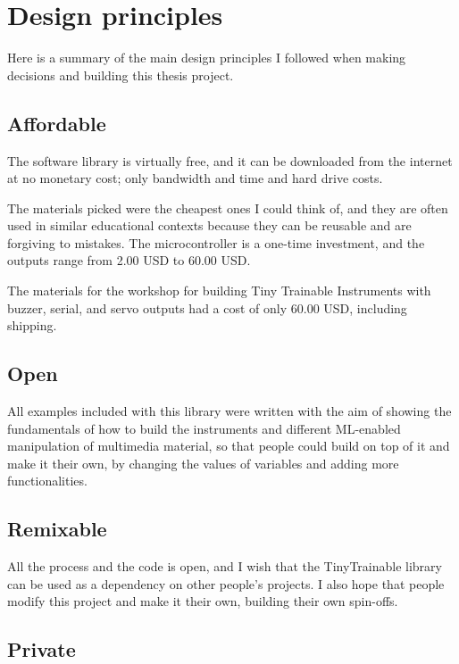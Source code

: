 \section{Design principles}

Here is a summary of the main design principles I followed when making decisions and building this thesis project.

\subsection{Affordable}

The software library is virtually free, and it can be downloaded from the internet at no monetary cost; only bandwidth and time and hard drive costs.

The materials picked were the cheapest ones I could think of, and they are often used in similar educational contexts because they can be reusable and are forgiving to mistakes. The microcontroller is a one-time investment, and the outputs range from 2.00 USD to 60.00 USD. 

The materials for the workshop for building Tiny Trainable Instruments with buzzer, serial, and servo outputs had a cost of only 60.00 USD, including shipping.

\subsection{Open}

All examples included with this library were written with the aim of showing the fundamentals of how to build the instruments and different \acrshort{ML}-enabled manipulation of multimedia material, so that people could build on top of it and make it their own, by changing the values of variables and adding more functionalities.

\subsection{Remixable}

All the process and the code is open, and I wish that the TinyTrainable library can be used as a dependency on other people's projects. I also hope that people modify this project and make it their own, building their own spin-offs. 

\subsection{Private}

